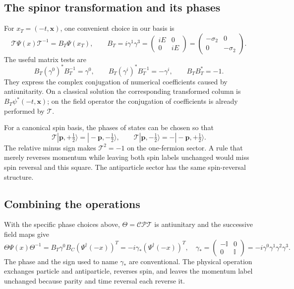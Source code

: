 \documentclass[11pt]{article}
\newcommand{\Dc}{\mathcal C}
\newcommand{\Dp}{\mathcal P}
\newcommand{\Dt}{\mathcal T}
\begin{document}
\subsection{The spinor transformation and its phases}
For \(x_T=(-t,\bm x)\), one convenient choice in our basis is
\begin{equation}
 \Dt\Psi(x)\Dt^{-1}=B_T\Psi(x_T),\qquad B_T=i\gamma^1\gamma^3= \begin{pmatrix}i E&0\\0&i E\end{pmatrix}= \begin{pmatrix}-\sigma_2&0\\0&-\sigma_2\end{pmatrix}.
 \label{f-eq:Tfield}
\end{equation}
The useful matrix tests are
\begin{equation}
 B_T(\gamma^0)^*B_T^{-1}=\gamma^0,\qquad
 B_T(\gamma^i)^*B_T^{-1}=-\gamma^i,\qquad B_TB_T^*=-1.
 \label{f-eq:Tmatrix}
\end{equation}
They express the complex conjugation of numerical coefficients caused
by antiunitarity. On a classical solution the corresponding transformed
column is \(B_T\psi^*(-t,\bm x)\); on the field operator the conjugation
of coefficients is already performed by \(\Dt\).

For a canonical spin basis, the phases of states can be chosen so that
\[
 \Dt|\bm p,+\tfrac12\rangle=|-\bm p,-\tfrac12\rangle,\qquad
 \Dt|\bm p,-\tfrac12\rangle=-|-\bm p,+\tfrac12\rangle.
\]
The relative minus sign makes \(\Dt^2=-1\) on the one-fermion sector.
A rule that merely reverses momentum while leaving both spin labels
unchanged would miss spin reversal and this square. The antiparticle
sector has the same spin-reversal structure.

\subsection{Combining the operations}
With the specific phase choices above, \(\Theta=\Dc\Dp\Dt\) is antiunitary
and the successive field maps give
\begin{equation}
 \Theta\Psi(x)\Theta^{-1}
   =B_T\gamma^0B_C(\Psi^\dagger(-x))^T
   =-i\gamma_* (\Psi^\dagger(-x))^T,
 \quad \gamma_*= \begin{pmatrix}-\mathbb{I}&0\\0&\mathbb{I}\end{pmatrix} =-i\gamma^0\gamma^1\gamma^2\gamma^3.
 \label{f-eq:CPT}
\end{equation}
The phase and the sign used to name \(\gamma_*\) are conventional.
The physical operation exchanges particle and antiparticle, reverses
spin, and leaves the momentum label unchanged because parity and time
reversal each reverse it.
\end{document}
